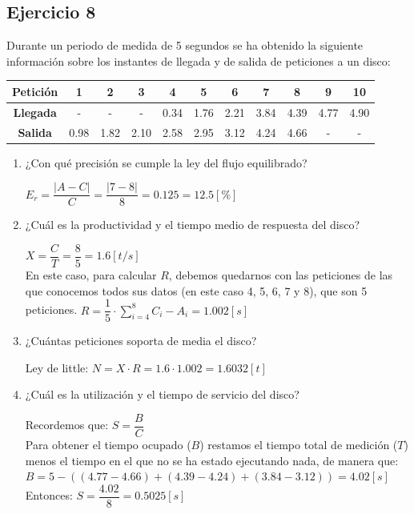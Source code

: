 \subsection{Ejercicio 8}
Durante un periodo de medida de 5 segundos se ha obtenido la siguiente información sobre los instantes de llegada y de salida de peticiones a un disco:
\begin{table}[H]\centering
\begin{tabular}{|c|c|c|c|c|c|c|c|c|c|c|}
\hline
\textbf{Petición} & 1    & 2    & 3    & 4    & 5    & 6    & 7    & 8    & 9    & 10   \\ \hline
\textbf{Llegada}  & -    & -    & -    & 0.34 & 1.76 & 2.21 & 3.84 & 4.39 & 4.77 & 4.90 \\ \hline
\textbf{Salida}   & 0.98 & 1.82 & 2.10 & 2.58 & 2.95 & 3.12 & 4.24 & 4.66 & -    & -    \\ \hline
\end{tabular}
\end{table}
\begin{enumerate}
    \item ¿Con qué precisión se cumple la ley del flujo equilibrado?
    \begin{tcolorbox}[colback=white,colframe=cyan!50!black,fonttitle=\bfseries]
    $E_r=\dfrac{|A-C|}{C}=\dfrac{|7-8|}{8}=0.125=12.5[\%]$
    \end{tcolorbox}
    \item ¿Cuál es la productividad y el tiempo medio de respuesta del disco?
    \begin{tcolorbox}[colback=white,colframe=cyan!50!black,fonttitle=\bfseries]
    $X=\dfrac{C}{T}=\dfrac{8}{5}=1.6[t/s]$\\
    En este caso, para calcular $R$, debemos quedarnos con las peticiones de las que conocemos todos sus datos (en este caso 4, 5, 6, 7 y 8), que son 5 peticiones.
    $R=\dfrac{1}{5}\cdot \sum_{i=4}^{8}C_i-A_i = 1.002[s]$
    \end{tcolorbox}
    \item ¿Cuántas peticiones soporta de media el disco?
    \begin{tcolorbox}[colback=white,colframe=cyan!50!black,fonttitle=\bfseries]
    Ley de little: $N=X\cdot R=1.6\cdot1.002=1.6032 [t]$
    \end{tcolorbox}
    \item ¿Cuál es la utilización y el tiempo de servicio del disco?
    \begin{tcolorbox}[colback=white,colframe=cyan!50!black,fonttitle=\bfseries]
    Recordemos que: $S=\dfrac{B}{C}$\\
    Para obtener el tiempo ocupado ($B$) restamos el tiempo total de medición ($T$) menos el tiempo en el que no se ha estado ejecutando nada, de manera que:\\
    $B=5 - ((4.77-4.66) + (4.39-4.24) + (3.84-3.12)) = 4.02 [s]$\\
    Entonces: $S=\dfrac{4.02}{8} = 0.5025[s]$
    \end{tcolorbox}
\end{enumerate}

